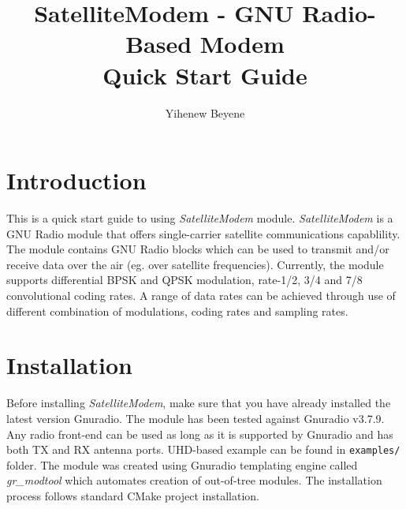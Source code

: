 \documentclass[peerreview,onecolumn]{IEEEtran}
\begin{document}
\title{SatelliteModem - GNU Radio-Based Modem \\
\LARGE{Quick Start Guide}}


\author{Yihenew Beyene
}
\date{}

\maketitle
\tableofcontents
\listoffigures

\IEEEpeerreviewmaketitle





\section{Introduction}
This is a quick start guide to using \emph{SatelliteModem} module. \emph{SatelliteModem} is a GNU Radio module that offers single-carrier satellite communications capablility. The module contains GNU Radio blocks which can be used to transmit and/or receive data over the air (eg. over satellite frequencies). Currently, the module supports differential BPSK and QPSK modulation, rate-1/2, 3/4 and 7/8 convolutional coding rates. A range of data rates can be achieved through use of different combination of modulations, coding rates and sampling rates.

\section{Installation}
Before installing \emph{SatelliteModem}, make sure that you have already installed the latest version Gnuradio. The module has been tested against Gnuradio v3.7.9. Any radio front-end can be used as long as it is supported by Gnuradio and has both TX and RX antenna ports. UHD-based example can be found in \texttt{examples/} folder. The module was created using Gnuradio templating engine called \emph{gr\_modtool} which automates creation of out-of-tree modules. The installation process follows standard CMake project installation.\\
\end{document}
